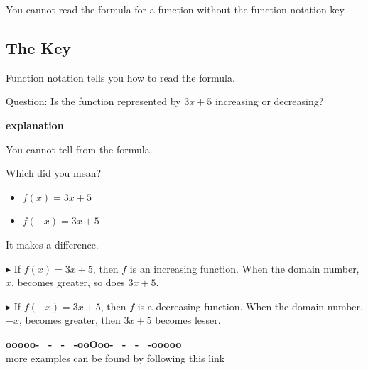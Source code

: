 \documentclass{ximera}
\begin{document}
You cannot read the formula for a function without the function notation key.


\subsection*{The Key}


Function notation tells you how to read the formula. 



\begin{example}



Question:  Is the function represented by $3x+5$ increasing or decreasing?


\textbf{\textcolor{red!75!green}{explanation}} 


You cannot tell from the formula.


Which did you mean?


\begin{itemize}
\item $f(x) = 3x + 5$
\item $f(-x) = 3x + 5$
\end{itemize}

It makes a difference. 



\textbf{\textcolor{blue!55!black}{$\blacktriangleright$}} If $f(x) = 3x + 5$, then $f$ is an increasing function.  When the domain number, $x$, becomes greater, so does $3x+5$. 



\textbf{\textcolor{blue!55!black}{$\blacktriangleright$}} If $f(-x) = 3x + 5$, then $f$ is a decreasing function.  When the domain number, $-x$, becomes greater, then $3x+5$ becomes lesser. 




\end{example}















































\begin{center}
\textbf{\textcolor{green!50!black}{ooooo-=-=-=-ooOoo-=-=-=-ooooo}} \\

more examples can be found by following this link\\ 

\end{center}
\end{document}
